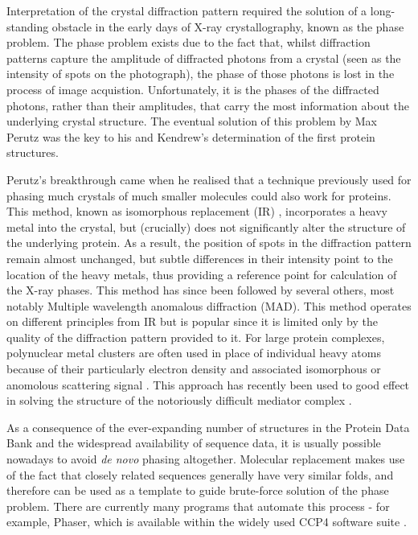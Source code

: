 \documentclass[a4paper,11pt,twoside,openright]{scrbook}
\let\cite\supercite
\begin{document}
Interpretation of the crystal diffraction pattern required the solution of a long-standing obstacle in the early days of X-ray crystallography, known as the phase problem. The phase problem exists due to the fact that, whilst diffraction patterns capture the amplitude of diffracted photons from a crystal (seen as the intensity of spots on the photograph), the phase of those photons is lost in the process of image acquistion. Unfortunately, it is the phases of the diffracted photons, rather than their amplitudes, that carry the most information about the underlying crystal structure. The eventual solution of this problem by Max Perutz was the key to his and Kendrew's determination of the first protein structures.

Perutz's breakthrough came when he realised that a technique previously used for phasing much crystals of much smaller molecules could also work for proteins. This method, known as isomorphous replacement (IR)  \cite{Robertson1936}, incorporates a heavy metal into the crystal, but (crucially) does not significantly alter the structure of the underlying protein. As a result, the position of spots in the diffraction pattern remain almost unchanged, but subtle differences in their intensity point to the location of the heavy metals, thus providing a reference point for calculation of the X-ray phases. This method has since been followed by several others, most notably Multiple wavelength anomalous diffraction (MAD). This method operates on different principles from IR but is popular since it is limited only by the quality of the diffraction pattern provided to it. For large protein complexes, polynuclear metal clusters are often used in place of individual heavy atoms because of their particularly electron density and associated isomorphous or anomolous scattering signal \cite{Dauter2005}. This approach has recently been used to good effect in solving the structure of the notoriously difficult mediator complex \cite{Nozawa2017}.

As a consequence of the ever-expanding number of structures in the Protein Data Bank and the widespread availability of sequence data, it is usually possible nowadays to avoid \textit{de novo} phasing altogether. Molecular replacement makes use of the fact that closely related sequences generally have very similar folds, and therefore can be used as a template to guide brute-force solution of the phase problem. There are currently many programs that automate this process - for example, Phaser, which is available within the widely used CCP4 software suite \cite{McCoy2007, Winn2011a}.
\end{document}
